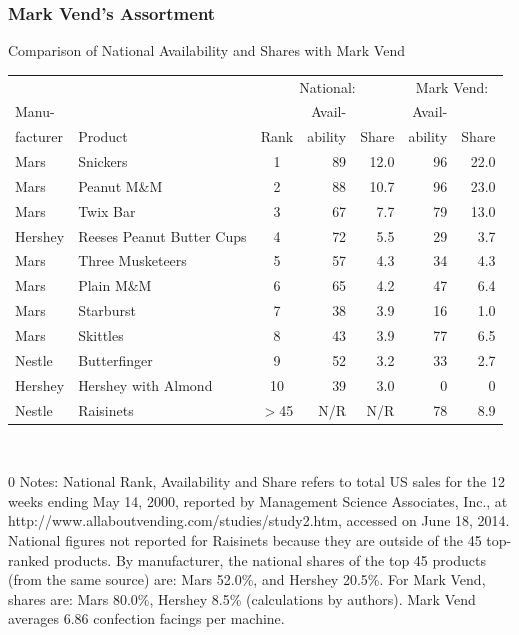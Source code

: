 \documentclass[aspectratio=169,11pt]{beamer}
\begin{document}
\begin{frame}
\frametitle{Mark Vend's Assortment}
\begin{center}
\vspace{-0.3in}
\scriptsize
Comparison of National Availability and Shares with Mark Vend
\begin{tabular}{|l|l|c|r|r|r|r|}
\hline
&&\multicolumn{3}{c|}{National:}&\multicolumn{2}{c|}{Mark Vend:} \\
Manu-& &&Avail-&& Avail- &  \\
facturer&Product &Rank&ability&Share& ability & Share \\
\hline \hline 
Mars& Snickers &1&89&12.0&96&22.0\\
Mars& Peanut M\&M&2&88&10.7&96&23.0\\
Mars& Twix Bar&3&67 &7.7&79&13.0\\
Hershey& Reeses Peanut Butter Cups &4&72&5.5& 29&3.7\\
Mars& Three Musketeers &5&57&4.3& 34&4.3\\
Mars& Plain M\&M  &6&65&4.2& 47&6.4\\
Mars& Starburst &7&38&3.9& 16&1.0\\
Mars& Skittles &8&43&3.9& 77&6.5\\
Nestle& Butterfinger &9&52&3.2& 33&2.7 \\
Hershey & Hershey with Almond &10&39&3.0&  0&0\\
Nestle& Raisinets &$>$45 &N/R &N/R& 78& 8.9\\
\hline
\end{tabular}\\
\end{center}
\begin{spacing}{0}
\tiny Notes: National Rank, Availability and Share refers to total US sales for the 12 weeks ending May 14, 2000, reported by Management Science Associates, Inc., at http://www.allaboutvending.com/studies/study2.htm, accessed on June 18, 2014.  National figures not reported for Raisinets because they are outside of the 45 top-ranked products.  By manufacturer, the national shares of the top 45 products (from the same source) are: Mars 52.0\%, and Hershey 20.5\%.  For Mark Vend, shares are: Mars 80.0\%, Hershey 8.5\% (calculations by authors).  Mark Vend averages 6.86 confection facings per machine.
\end{spacing}
\end{frame}
\end{document}
